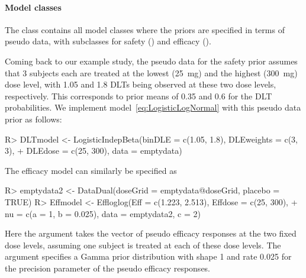 \documentclass[article]{jss}\usepackage[]{graphicx}\usepackage[]{color}
\begin{document}
\paragraph{Model classes}
The  class contains all model classes where the priors are specified in terms of pseudo data, with subclasses for safety () and efficacy ().

Coming back to our example study, the pseudo data for the safety prior assumes that 3 subjects each are treated at the lowest (25~mg) and the highest (300~mg) dose level, with 1.05 and 1.8
DLTs being observed at these two dose levels, respectively. This corresponds to prior 
means of 0.35 and 0.6 for the DLT probabilities. We implement 
model~\eqref{eq:LogisticLogNormal} with this pseudo data prior as follows:
\begin{Schunk}
\begin{Sinput}
R> DLTmodel <- LogisticIndepBeta(binDLE = c(1.05, 1.8), DLEweights = c(3, 3),
+                                DLEdose = c(25, 300), data = emptydata)
\end{Sinput}
\end{Schunk}

The efficacy model can similarly be specified as
\begin{Schunk}
\begin{Sinput}
R> emptydata2 <- DataDual(doseGrid = emptydata@doseGrid, placebo = TRUE)
R> Effmodel <- Effloglog(Eff = c(1.223, 2.513), Effdose = c(25, 300), 
+                        nu = c(a = 1, b = 0.025), data = emptydata2, c = 2)
\end{Sinput}
\end{Schunk}
Here the argument  takes the vector of pseudo efficacy responses at the two fixed dose levels, assuming one subject is treated at each of these dose levels. The argument  specifies a Gamma prior distribution with shape 1 and rate 0.025 for the precision parameter of the pseudo efficacy responses.
\end{document}
